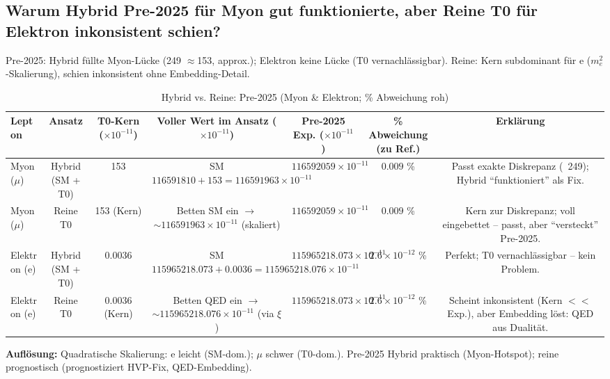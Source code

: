 \documentclass[12pt,a4paper]{article}
\theoremstyle{definition}
\begin{document}
	\subsection{Warum Hybrid Pre-2025 für Myon gut funktionierte, aber Reine T0 für Elektron inkonsistent schien?}
	
	Pre-2025: Hybrid füllte Myon-Lücke (249 $\approx$153, approx.); Elektron keine Lücke (T0 vernachlässigbar). Reine: Kern subdominant für e ($m_e^2$-Skalierung), schien inkonsistent ohne Embedding-Detail.
	
	\begin{table}[ht!]
		\centering
		\small
		\begin{adjustbox}{max width=\textwidth}
			\begin{tabular}{@{}lcccccc@{}}
				\toprule
				Lepton & Ansatz & T0-Kern ($ \times 10^{-11}$) & Voller Wert im Ansatz ($ \times 10^{-11}$) & Pre-2025 Exp. ($ \times 10^{-11}$) & \% Abweichung (zu Ref.) & Erklärung \\
				\midrule
				Myon ($\mu$) & Hybrid (SM + T0) & 153 & SM $116591810 + 153 = 116591963 \times 10^{-11}$ & $116592059 \times 10^{-11}$ & $0.009$ \% & Passt exakte Diskrepanz (~249); Hybrid ``funktioniert'' als Fix. \\
				Myon ($\mu$) & Reine T0 & 153 (Kern) & Betten SM ein $\to$ $\sim 116591963 \times 10^{-11}$ (skaliert) & $116592059 \times 10^{-11}$ & $0.009$ \% & Kern zur Diskrepanz; voll eingebettet -- passt, aber ``versteckt'' Pre-2025. \\
				Elektron (e) & Hybrid (SM + T0) & 0.0036 & SM $115965218.073 + 0.0036 = 115965218.076 \times 10^{-11}$ & $115965218.073 \times 10^{-11}$ & $2.6 \times 10^{-12}$ \% & Perfekt; T0 vernachlässigbar -- kein Problem. \\
				Elektron (e) & Reine T0 & 0.0036 (Kern) & Betten QED ein $\to$ $\sim 115965218.076 \times 10^{-11}$ (via $\xi$) & $115965218.073 \times 10^{-11}$ & $2.6 \times 10^{-12}$ \% & Scheint inkonsistent (Kern $<<$ Exp.), aber Embedding löst: QED aus Dualität. \\
				\bottomrule
			\end{tabular}
		\end{adjustbox}
		\caption{Hybrid vs. Reine: Pre-2025 (Myon \& Elektron; \% Abweichung roh)}
		\label{tab:hybrid_inconsistency}
	\end{table}
	
	\textbf{Auflösung:} Quadratische Skalierung: e leicht (SM-dom.); $\mu$ schwer (T0-dom.). Pre-2025 Hybrid praktisch (Myon-Hotspot); reine prognostisch (prognostiziert HVP-Fix, QED-Embedding).
	
\end{document}
